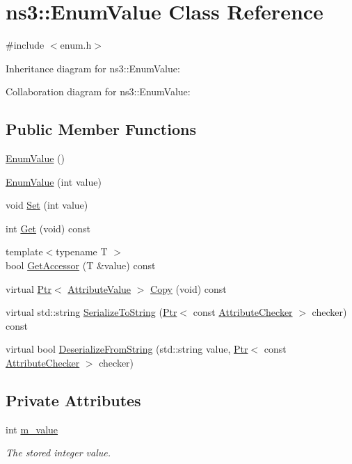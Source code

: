 \hypertarget{classns3_1_1EnumValue}{}\section{ns3\+:\+:Enum\+Value Class Reference}
\label{classns3_1_1EnumValue}


{\ttfamily \#include $<$enum.\+h$>$}



Inheritance diagram for ns3\+:\+:Enum\+Value\+:


Collaboration diagram for ns3\+:\+:Enum\+Value\+:
\subsection*{Public Member Functions}
\begin{DoxyCompactItemize}
\item 
\hyperlink{classns3_1_1EnumValue_a1a57e1bf2fecec7119db9bfa0d1a28c7}{Enum\+Value} ()
\item 
\hyperlink{classns3_1_1EnumValue_a7e27eda0e6b3fc688a37b208fc26ae9c}{Enum\+Value} (int value)
\item 
void \hyperlink{classns3_1_1EnumValue_a0a2fe3a86348d3c726035a7509caa918}{Set} (int value)
\item 
int \hyperlink{classns3_1_1EnumValue_a97f5add33e9608e918a84207beaf8eb9}{Get} (void) const 
\item 
{\footnotesize template$<$typename T $>$ }\\bool \hyperlink{classns3_1_1EnumValue_a771a6238cdb660860b130ae63e558d34}{Get\+Accessor} (T \&value) const 
\item 
virtual \hyperlink{classns3_1_1Ptr}{Ptr}$<$ \hyperlink{classns3_1_1AttributeValue}{Attribute\+Value} $>$ \hyperlink{classns3_1_1EnumValue_a94fa11552b7116d65909b13e95fcc436}{Copy} (void) const 
\item 
virtual std\+::string \hyperlink{classns3_1_1EnumValue_a753378a21c9c99f5700833c21be399ff}{Serialize\+To\+String} (\hyperlink{classns3_1_1Ptr}{Ptr}$<$ const \hyperlink{classns3_1_1AttributeChecker}{Attribute\+Checker} $>$ checker) const 
\item 
virtual bool \hyperlink{classns3_1_1EnumValue_a5cf2ed6ecc24747170c59aaff8545da1}{Deserialize\+From\+String} (std\+::string value, \hyperlink{classns3_1_1Ptr}{Ptr}$<$ const \hyperlink{classns3_1_1AttributeChecker}{Attribute\+Checker} $>$ checker)
\end{DoxyCompactItemize}
\subsection*{Private Attributes}
\begin{DoxyCompactItemize}
\item 
int \hyperlink{classns3_1_1EnumValue_a8c2ab33703e2a542f702d48cfc660c18}{m\+\_\+value}
\begin{DoxyCompactList}\small\item\em The stored integer value. \end{DoxyCompactList}\end{DoxyCompactItemize}
